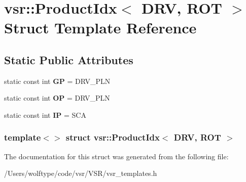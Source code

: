 \hypertarget{structvsr_1_1_product_idx_3_01_d_r_v_00_01_r_o_t_01_4}{\section{vsr\-:\-:Product\-Idx$<$ D\-R\-V, R\-O\-T $>$ Struct Template Reference}
\label{structvsr_1_1_product_idx_3_01_d_r_v_00_01_r_o_t_01_4}
}
\subsection*{Static Public Attributes}
\begin{DoxyCompactItemize}
\item 
\hypertarget{structvsr_1_1_product_idx_3_01_d_r_v_00_01_r_o_t_01_4_a9ad23f82665483f9e1bf75bc9c1ce29e}{static const int {\bfseries G\-P} = D\-R\-V\-\_\-\-P\-L\-N}\label{structvsr_1_1_product_idx_3_01_d_r_v_00_01_r_o_t_01_4_a9ad23f82665483f9e1bf75bc9c1ce29e}

\item 
\hypertarget{structvsr_1_1_product_idx_3_01_d_r_v_00_01_r_o_t_01_4_af13b4a5ac0986204ce01a2008dbbc6d7}{static const int {\bfseries O\-P} = D\-R\-V\-\_\-\-P\-L\-N}\label{structvsr_1_1_product_idx_3_01_d_r_v_00_01_r_o_t_01_4_af13b4a5ac0986204ce01a2008dbbc6d7}

\item 
\hypertarget{structvsr_1_1_product_idx_3_01_d_r_v_00_01_r_o_t_01_4_ab3a9fbf5eb31ace6aa2a522b713295f1}{static const int {\bfseries I\-P} = S\-C\-A}\label{structvsr_1_1_product_idx_3_01_d_r_v_00_01_r_o_t_01_4_ab3a9fbf5eb31ace6aa2a522b713295f1}

\end{DoxyCompactItemize}
\subsubsection*{template$<$$>$ struct vsr\-::\-Product\-Idx$<$ D\-R\-V, R\-O\-T $>$}



The documentation for this struct was generated from the following file\-:\begin{DoxyCompactItemize}
\item 
/\-Users/wolftype/code/vsr/\-V\-S\-R/vsr\-\_\-templates.\-h\end{DoxyCompactItemize}
